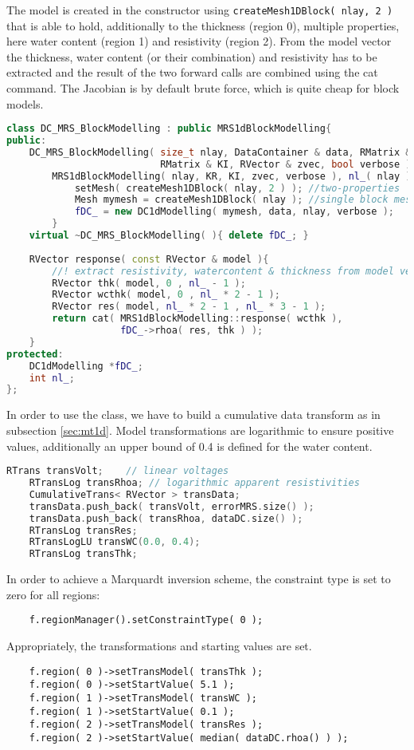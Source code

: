 The model is created in the constructor using \lstinline|createMesh1DBlock( nlay, 2 )| that is able to hold, additionally to the thickness (region 0), multiple properties, here water content (region 1) and resistivity (region 2).
From the model vector the thickness, water content (or their combination) and resistivity has to be extracted and the result of the two forward calls are combined using the cat command.
The Jacobian is by default brute force, which is quite cheap for block models.

\begin{lstlisting}[language=C++,morekeywords={RVector,RMatrix}]
class DC_MRS_BlockModelling : public MRS1dBlockModelling{
public:
    DC_MRS_BlockModelling( size_t nlay, DataContainer & data, RMatrix & KR,
                           RMatrix & KI, RVector & zvec, bool verbose ) :
        MRS1dBlockModelling( nlay, KR, KI, zvec, verbose ), nl_( nlay ) { 
            setMesh( createMesh1DBlock( nlay, 2 ) ); //two-properties
            Mesh mymesh = createMesh1DBlock( nlay ); //single block mesh
            fDC_ = new DC1dModelling( mymesh, data, nlay, verbose );
        }
    virtual ~DC_MRS_BlockModelling( ){ delete fDC_; }
    
    RVector response( const RVector & model ){
        //! extract resistivity, watercontent & thickness from model vec
        RVector thk( model, 0 , nl_ - 1 );
        RVector wcthk( model, 0 , nl_ * 2 - 1 );
        RVector res( model, nl_ * 2 - 1 , nl_ * 3 - 1 );
        return cat( MRS1dBlockModelling::response( wcthk ), 
                    fDC_->rhoa( res, thk ) );
    }
protected:
    DC1dModelling *fDC_;
    int nl_;
};
\end{lstlisting}

In order to use the class, we have to build a cumulative data transform as in subsection \ref{sec:mt1d}.
Model transformations are logarithmic to ensure positive values, additionally an upper bound of 0.4 is defined for the water content.
\begin{lstlisting}[language=C++,morekeywords={RVector,RMatrix}]
    RTrans transVolt;    // linear voltages
    RTransLog transRhoa; // logarithmic apparent resistivities
    CumulativeTrans< RVector > transData;
    transData.push_back( transVolt, errorMRS.size() );
    transData.push_back( transRhoa, dataDC.size() );
    RTransLog transRes;
    RTransLogLU transWC(0.0, 0.4);
    RTransLog transThk;
\end{lstlisting}

In order to achieve a Marquardt inversion scheme, the constraint type is set to zero for all regions:
\begin{lstlisting}
    f.regionManager().setConstraintType( 0 );
\end{lstlisting}
Appropriately, the transformations and starting values are set.
\begin{lstlisting}
    f.region( 0 )->setTransModel( transThk );
    f.region( 0 )->setStartValue( 5.1 );
    f.region( 1 )->setTransModel( transWC );
    f.region( 1 )->setStartValue( 0.1 );
    f.region( 2 )->setTransModel( transRes );
    f.region( 2 )->setStartValue( median( dataDC.rhoa() ) );
\end{lstlisting}

